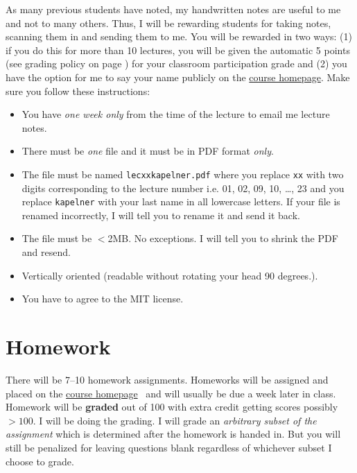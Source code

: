 \documentclass[12pt]{article}
\newcommand{\coursewebpage}{\href{https://github.com/kapelner/QC_Math_369_Fall_2020}{course homepage}}
\begin{document}
As many previous students have noted, my handwritten notes are useful to me and not to many others. Thus, I will be rewarding students for taking notes, scanning them in and sending them to me. You will be rewarded in two ways: (1) if you do this for more than 10 lectures, you will be given the automatic 5 points (see grading policy on page \pageref{sec:grading}) for your classroom participation grade and (2) you have the option for me to say your name publicly on the \coursewebpage. Make sure you follow these instructions:

\begin{itemize}
\item You have \emph{one week only} from the time of the lecture to email me lecture notes.
\item There must be \emph{one} file and it must be in PDF format \textit{only}.
\item The file must be named \texttt{lecxxkapelner.pdf} where you replace \texttt{xx} with two digits corresponding to the lecture number i.e. 01, 02, 09, 10, \ldots, 23 and you replace \texttt{kapelner} with your last name in all lowercase letters. If your file is renamed incorrectly, I will tell you to rename it and send it back.
\item The file must be $<$2MB. No exceptions. I will tell you to shrink the PDF and resend.
\item Vertically oriented (readable without rotating your head 90 degrees.).
\item You have to agree to the MIT license.
\end{itemize}

\section*{Homework}

There will be 7--10 homework assignments. Homeworks will be assigned and placed on the \coursewebpage~ and will usually be due a week later in class. Homework will be \textbf{graded} out of 100 with extra credit getting scores possibly $> 100$. I will be doing the grading. I will grade an \textit{arbitrary subset of the assignment} which is determined after the homework is handed in. But you will still be penalized for leaving questions blank regardless of whichever subset I choose to grade. 

%
\end{document}
